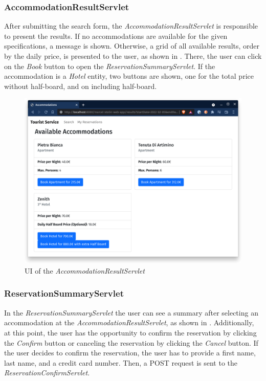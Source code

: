 \subsubsection{AccommodationResultServlet}\label{sec:02_design_web_results}
After submitting the search form, the \textit{AccommodationResultServlet} is responsible to present the results.
If no accommodations are available for the given specifications, a message is shown.
Otherwise, a grid of all available results, order by the daily price, is presented to the user, as shown in . There, the user can click on the \textit{Book} button to open the \textit{ReservationSummaryServlet}. If the accommodation is a \textit{Hotel} entity, two buttons are shown, one for the total price without half-board, and on including half-board.
\begin{figure}[h]
\centering
\includegraphics[scale=0.14]{images/02_design/web-app-results}
\caption{UI of the \textit{AccommodationResultServlet}}
\label{fig:02_design_web_results_page}
\end{figure}

\newpage
\subsubsection{ReservationSummaryServlet}\label{sec:02_design_web_reservationsummary}
In the \textit{ReservationSummaryServlet} the user can see a summary after selecting an accommodation at the \textit{AccommodationResultServlet}, as shown in .
Additionally, at this point, the user has the opportunity to confirm the reservation by clicking the \textit{Confirm} button or canceling the reservation by clicking the \textit{Cancel} button.
If the user decides to confirm the reservation, the user has to provide a first name, last name, and a credit card number. Then, a POST request is sent to the \textit{ReservationConfirmServlet}.

